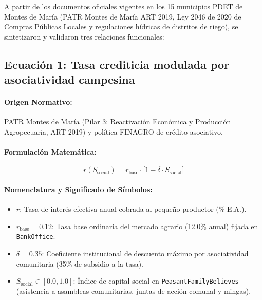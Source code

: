 \documentclass[11pt,a4paper]{article}
\begin{document}
A partir de los documentos oficiales vigentes en los 15 municipios PDET de Montes de Mar\'ia (PATR Montes de Mar\'ia ART 2019, Ley 2046 de 2020 de Compras P\'ublicas Locales y regulaciones h\'idricas de distritos de riego), se sintetizaron y validaron tres relaciones funcionales:

\subsection{Ecuaci\'on 1: Tasa crediticia modulada por asociatividad campesina}

\paragraph{Origen Normativo:} PATR Montes de Mar\'ia (Pilar 3: Reactivaci\'on Econ\'omica y Producci\'on Agropecuaria, ART 2019) y pol\'itica FINAGRO de cr\'edito asociativo.

\paragraph{Formulaci\'on Matem\'atica:}
\begin{equation}
    r(S_{\text{social}}) = r_{\text{base}} \cdot \Big[1 - \delta \cdot S_{\text{social}}\Big]
\end{equation}

\paragraph{Nomenclatura y Significado de S\'imbolos:}
\begin{itemize}[leftmargin=*]
    \item $r$: Tasa de inter\'es efectiva anual cobrada al peque\~no productor (\% E.A.).
    \item $r_{\text{base}} = 0.12$: Tasa base ordinaria del mercado agrario (12.0\% anual) fijada en \texttt{BankOffice}.
    \item $\delta = 0.35$: Coeficiente institucional de descuento m\'aximo por asociatividad comunitaria (35\% de subsidio a la tasa).
    \item $S_{\text{social}} \in [0.0, 1.0]$: \'Indice de capital social en \texttt{PeasantFamilyBelieves} (asistencia a asambleas comunitarias, juntas de acci\'on comunal y mingas).
\end{itemize}
\end{document}

